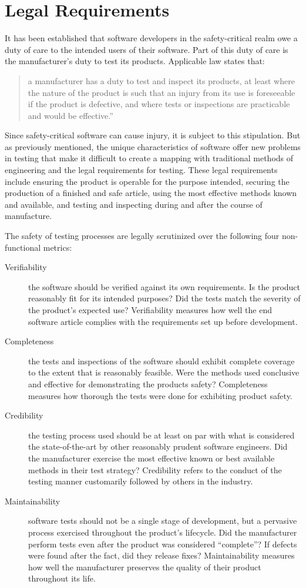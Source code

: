 \section{Legal Requirements}

It has been established that software developers in the safety-critical realm
owe a duty of care to the intended users of their software. Part of this duty
of care is the manufacturer's duty to test its products. Applicable law states
that:

\begin{quote}
a manufacturer has a duty to test and inspect its products, at least where the
nature of the product is such that an injury from its use is foreseeable if the
product is defective, and where tests or inspections are practicable and would
be effective.''
\end{quote}

Since safety-critical software can cause injury, it is subject to this
stipulation. But as previously mentioned, the unique characteristics of
software offer new problems in testing that make it difficult to create a
mapping with traditional methods of engineering and the legal requirements for
testing. These legal requirements include ensuring the product is operable for
the purpose intended, securing the production of a finished and safe article,
using the most effective methods known and available, and testing and
inspecting during and after the course of manufacture.

The safety of testing processes are legally scrutinized over the following four
non-functional metrics: 

\begin{description}
\item[Verifiability] the software should be verified against its own
requirements. Is the product reasonably fit for its intended purposes? Did the
tests match the severity of the product's expected use? Verifiability measures
how well the end software article complies with the requirements set up before
development.
\item[Completeness] the tests and inspections of the software should exhibit
complete coverage to the extent that is reasonably feasible. Were the methods
used conclusive and effective for demonstrating the products safety?
Completeness measures how thorough the tests were done for exhibiting product
safety.
\item[Credibility] the testing process used should be at least on par with what
is considered the state-of-the-art by other reasonably prudent software
engineers. Did the manufacturer exercise the most effective known or best
available methods in their test strategy? Credibility refers to the conduct of
the testing manner customarily followed by others in the industry.
\item[Maintainability] software tests should not be a single stage of
development, but a pervasive process exercised throughout the product's
lifecycle. Did the manufacturer perform tests even after the product was
considered ``complete''? If defects were found after the fact, did they release
fixes? Maintainability measures how well the manufacturer preserves the quality
of their product throughout its life.
\end{description}
